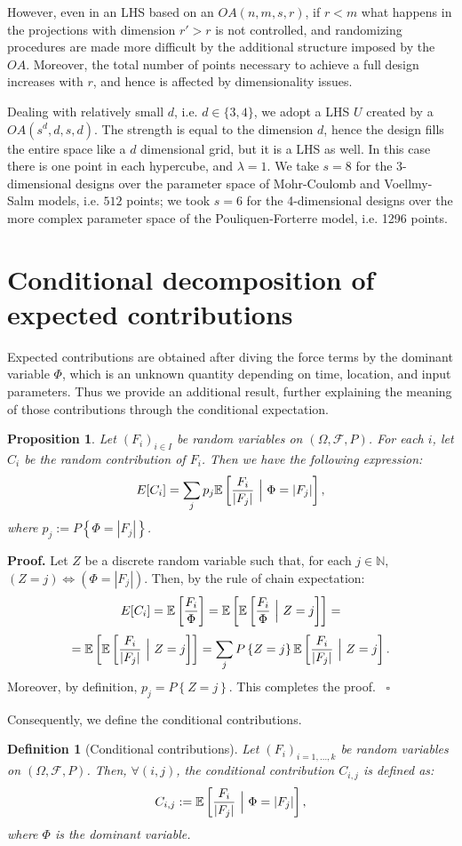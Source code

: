 \documentclass{article}
\newtheorem{definition}[theorem]{Definition}
\newtheorem{proposition}[theorem]{Proposition}
\newenvironment{proof}[1][Proof]{\noindent\textbf{#1.} }{\ $\square$}
\begin{document}
However, even in an LHS based on an $OA(n,m,s,r)$, if $r<m$ what happens in the projections with dimension $r'>r$ is not controlled, and randomizing procedures are made more difficult by the additional structure imposed by the $OA$. Moreover, the total number of points necessary to achieve a full design increases with $r$, and hence is affected by dimensionality issues.

Dealing with relatively small $d$, i.e. $d\in\{3,4\}$, we adopt a LHS $U$ created by a $OA(s^d,d,s,d)$. The strength is equal to the dimension $d$, hence the design fills the entire space like a $d$ dimensional grid, but it is a LHS as well. In this case there is one point in each hypercube, and $\lambda=1$. We take $s=8$ for the 3-dimensional designs over the parameter space of Mohr-Coulomb and Voellmy-Salm models, i.e. $512$ points; we took $s=6$ for the 4-dimensional designs over the more complex parameter space of the Pouliquen-Forterre model, i.e. 1296 points.

\section{Conditional decomposition of expected contributions}\label{A-2}
Expected contributions are obtained after diving the force terms by the dominant variable $\Phi$, which is an unknown quantity depending on time, location, and input parameters. Thus we provide an additional result, further explaining the meaning of those contributions through the conditional expectation.

\begin{proposition}
Let $(F_i)_{i\in I}$ be random variables on $(\Omega, \mathcal F, P)$. For each $i$, let $C_i$ be the random contribution of $F_i$. Then we have the following expression:
$$E[C_i]=\sum_j p_j \mathbb E\left[\frac{F_i}{|F_j|}\ \Big{|}\ \Phi=|F_j|\right],$$
where $p_j:=P\left\{\Phi=|F_j|\right\}$.
\end{proposition}

\begin{proof}
Let $Z$ be a discrete random variable such that, for each $j\in\mathbb N$, $(Z=j) \Longleftrightarrow (\Phi=|F_j|)$. Then, by the rule of chain expectation:
$$E[C_i]=\mathbb E\left[\frac{F_i}{\Phi}\right]=\mathbb E\left[\mathbb E\left[\frac{F_i}{\Phi}\ \Big{|}\ Z=j\right]\right]=$$
$$=\mathbb E\left[\mathbb E\left[\frac{F_i}{|F_j|}\ \Big{|}\ Z=j\right]\right]=\sum_j P\left\{Z=j\right\} \mathbb E\left[\frac{F_i}{|F_j|}\ \Big{|}\ Z=j\right].$$
Moreover, by definition, $p_j=P\left\{Z=j\right\}$. This completes the proof.
\end{proof}

Consequently, we define the conditional contributions.

\begin{definition}[Conditional contributions]
Let $(F_i)_{i=1,\dots, k}$ be random variables on $(\Omega, \mathcal F, P)$. Then, $\forall (i,j)$, the conditional contribution $C_{i,j}$ is defined as:
$$C_{i,j}:=\mathbb E\left[\frac{F_i}{|F_j|}\ \Big{|}\ \Phi=|F_j|\right],$$
where $\Phi$ is the dominant variable.
\end{definition}



\end{document}
